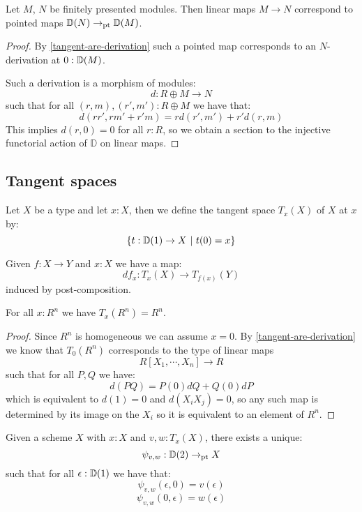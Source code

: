 \begin{lemma}\label{equivalence-module-infinitesimal}
Let $M$, $N$ be finitely presented modules. Then linear maps $M \to N$ correspond to
pointed maps $\mathbb{D}(N) \to_{\mathrm{pt}} \mathbb{D}(M)$. 
\end{lemma}

\begin{proof}
By \cref{tangent-are-derivation} such a pointed map corresponds to an $N$-derivation at $0:\mathbb{D}(M)$.

Such a derivation is a morphism of modules:
\[d:R\oplus M\to N\]
such that for all $(r,m),(r',m'):R\oplus M$ we have that:
\[d(rr',rm'+r'm) = rd(r',m')+r'd(r,m)\]
This implies $d(r,0) = 0$ for all $r : R$, so we obtain a section to the injective functorial action of $\mathbb{D}$ on linear maps.
\end{proof}


\subsection{Tangent spaces}

\begin{definition}
Let $X$ be a type and let $x:X$, then we define the tangent space $T_x(X)$ of $X$ at $x$ by:
\[\{t:\D(1)\to X\ |\ t(0)=x\}\]
\end{definition}

\begin{definition}
Given $f:X\to Y$ and $x:X$ we have a map:
\[df_x : T_x(X)\to T_{f(x)}(Y)\]
induced by post-composition.
\end{definition}

\begin{lemma}\label{An-dimension-n}
For all $x:R^n$ we have $T_x(R^n) = R^n$.
\end{lemma}

\begin{proof}
Since $R^n$ is homogeneous we can assume $x=0$. By \cref{tangent-are-derivation} we know that $T_0(R^n)$ corresponds to the type of linear maps
\[R[X_1,\cdots,X_n] \to R\]
such that for all $P,Q$ we have:
\[d(PQ) = P(0)dQ + Q(0)dP\]
which is equivalent to $d(1) = 0$ and $d(X_iX_j) = 0$, so any such map is determined by its image on the $X_i$ so it is equivalent to an element of $R^n$.
\end{proof}

\begin{lemma}\label{from-D1-to-D2}
Given a scheme $X$ with $x:X$ and $v,w:T_x(X)$, there exists a unique:
\[\psi_{v,w} : \mathbb{D}(2)\to_{\mathrm{pt}} X\]
such that for all $\epsilon:\mathbb{D}(1)$ we have that:
\[\psi_{v,w}(\epsilon,0) = v(\epsilon)\]
\[\psi_{v,w}(0,\epsilon) = w(\epsilon)\]
\end{lemma}

